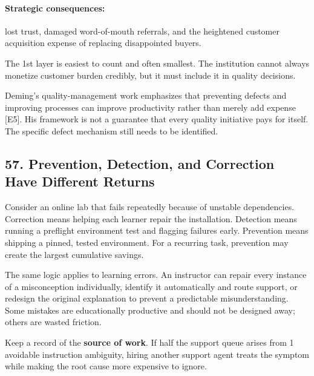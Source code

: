 \paragraph*{Strategic consequences:} lost trust, damaged word-of-mouth referrals, and the heightened customer acquisition expense of replacing disappointed buyers.

The 1st layer is easiest to count and often smallest. The institution cannot always monetize customer burden credibly, but it must include it in quality decisions.

Deming's quality-management work emphasizes that preventing defects and improving processes can improve productivity rather than merely add expense [E5]. His framework is not a guarantee that every quality initiative pays for itself. The specific defect mechanism still needs to be identified.

\subsection*{57. Prevention, Detection, and Correction Have Different Returns}

Consider an online lab that fails repeatedly because of unstable dependencies. Correction means helping each learner repair the installation. Detection means running a preflight environment test and flagging failures early. Prevention means shipping a pinned, tested environment. For a recurring task, prevention may create the largest cumulative savings.

The same logic applies to learning errors. An instructor can repair every instance of a misconception individually, identify it automatically and route support, or redesign the original explanation to prevent a predictable misunderstanding. Some mistakes are educationally productive and should not be designed away; others are wasted friction.

Keep a record of the \textbf{source of work}. If half the support queue arises from 1 avoidable instruction ambiguity, hiring another support agent treats the symptom while making the root cause more expensive to ignore.
